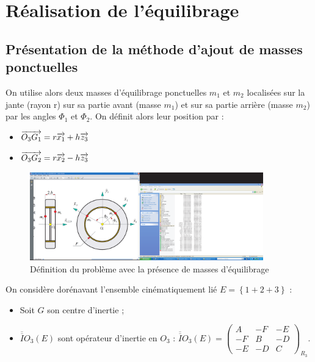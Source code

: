 \documentclass[10pt,fleqn]{article} %
\begin{document}
\section{Réalisation de l'équilibrage}
\subsection{Présentation de la méthode d'ajout de masses ponctuelles}
On utilise alors deux masses d'équilibrage ponctuelles $m_1$ et $m_2$ localisées sur la jante (rayon r) sur sa partie avant (masse $m_1$) et sur sa partie arrière (masse $m_2$) par les angles $\Phi_1$ et $\Phi_2$.
On définit alors leur position par :
\begin{itemize}
\item $\overrightarrow{O_3G_1}=r \overrightarrow{x_1}+h\overrightarrow{z_3}$
\item $\overrightarrow{O_3G_2}=r \overrightarrow{x_2}-h\overrightarrow{z_3}$
\end{itemize}


\begin{figure}[ht!]
\begin{center}
\includegraphics[width=0.9\textwidth]{images/figure-masse-roue.pdf}
\end{center}
\caption{Définition du problème avec la présence de masses d'équilibrage}
\end{figure}

On considère dorénavant l'ensemble cinématiquement lié $E=\left\{1+2+3\right\}$ : 
\begin{itemize}
\item Soit $G$ son centre d'inertie ;
\item $\overline{\overline{I}}{O_3}(E)$ sont opérateur d'inertie en $O_3$ :
$
\overline{\overline{I}}{O_3}(E)=
\left(\begin{array}{ccc}
A & -F & -E \\ 
-F & B & -D \\ 
-E & -D & C
\end{array} \right)_{R_3}
$.
\end{itemize}
\end{document}
